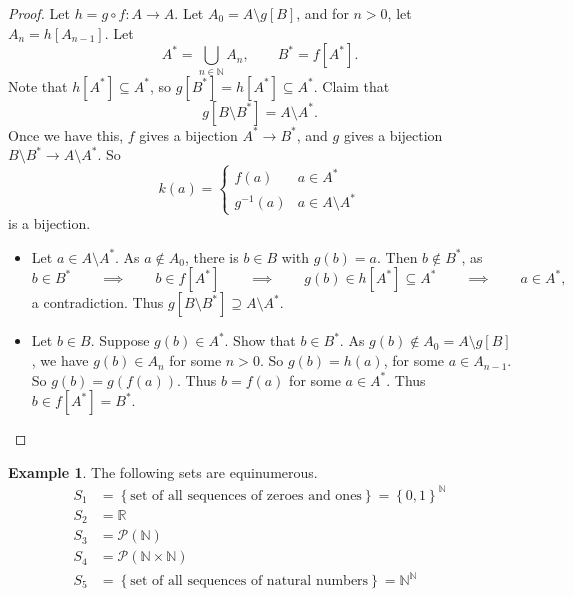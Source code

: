 \documentclass{article}
\newcommand{\N}{\mathbb{N}}
\newcommand{\R}{\mathbb{R}}
\newcommand{\rb}[1]{\left( #1 \right)}
\renewcommand{\sb}[1]{\left[ #1 \right]}
\newcommand{\cb}[1]{\left\{ #1 \right\}}
\theoremstyle{definition}\newtheorem{definition}{Definition}[subsection]
\theoremstyle{definition}\newtheorem{remark1}[definition]{Remark}
\theoremstyle{definition}\newtheorem{example1}[definition]{Example}
\theoremstyle{definition}\newtheorem*{remark2}{Remark}
\theoremstyle{definition}\newtheorem*{example2}{Example}
\theoremstyle{definition}\newtheorem*{note}{Note}
\theoremstyle{definition}\newtheorem*{notation}{Notation}
\begin{document}
\begin{proof}
Let $ h = g \circ f : A \to A $. Let $ A_0 = A \setminus g\sb{B} $, and for $ n > 0 $, let $ A_n = h\sb{A_{n - 1}} $. Let
$$ A^* = \bigcup_{n \in \N} A_n, \qquad B^* = f\sb{A^*}. $$
Note that $ h\sb{A^*} \subseteq A^* $, so $ g\sb{B^*} = h\sb{A^*} \subseteq A^* $. Claim that
$$ g\sb{B \setminus B^*} = A \setminus A^*. $$
Once we have this, $ f $ gives a bijection $ A^* \to B^* $, and $ g $ gives a bijection $ B \setminus B^* \to A \setminus A^* $. So
$$ k\rb{a} = \begin{cases}
f\rb{a} & a \in A^* \\
g^{-1}\rb{a} & a \in A \setminus A^*
\end{cases} $$
is a bijection.
\begin{itemize}
\item Let $ a \in A \setminus A^* $. As $ a \notin A_0 $, there is $ b \in B $ with $ g\rb{b} = a $. Then $ b \notin B^* $, as
$$ b \in B^* \qquad \implies \qquad b \in f\sb{A^*} \qquad \implies \qquad g\rb{b} \in h\sb{A^*} \subseteq A^* \qquad \implies \qquad a \in A^*, $$
a contradiction. Thus $ g\sb{B \setminus B^*} \supseteq A \setminus A^* $.
\item Let $ b \in B $. Suppose $ g\rb{b} \in A^* $. Show that $ b \in B^* $. As $ g\rb{b} \notin A_0 = A \setminus g\sb{B} $, we have $ g\rb{b} \in A_n $ for some $ n > 0 $. So $ g\rb{b} = h\rb{a} $, for some $ a \in A_{n - 1} $. So $ g\rb{b} = g\rb{f\rb{a}} $. Thus $ b = f\rb{a} $ for some $ a \in A^* $. Thus $ b \in f\sb{A^*} = B^* $.
\end{itemize}
\end{proof}

\begin{example1}
The following sets are equinumerous.
\begin{align*}
S_1 & = \cb{\text{set of all sequences of zeroes and ones}} = \cb{0, 1}^\N \\
S_2 & = \R \\
S_3 & = \mathcal{P}\rb{\N} \\
S_4 & = \mathcal{P}\rb{\N \times \N} \\
S_5 & = \cb{\text{set of all sequences of natural numbers}} = \N^\N
\end{align*}
\end{example1}
\end{document}
